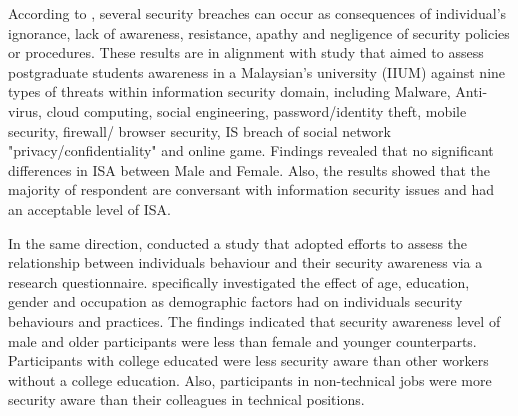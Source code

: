 According to \citet{safa2015information}, several security breaches can occur as consequences of individual's ignorance, lack of awareness, resistance, apathy and negligence of security policies or procedures. 
These results are in alignment with  \citet{Hamid2014} study that aimed to assess postgraduate students awareness in a Malaysian's university (IIUM) against nine types of threats within information security domain, including Malware, Anti-virus, cloud computing, social engineering, password/identity theft, mobile security, firewall/ browser security, IS breach of social network "privacy/confidentiality" and online game. Findings revealed that no significant differences in ISA between Male and Female. Also, the results showed that the majority of respondent are conversant with information security issues and had an acceptable level of ISA. 

In the same direction, \citet{Grant2010} conducted a study that adopted \citet{Katz2005} efforts to assess the relationship between individuals behaviour and their security awareness via a research questionnaire. \citet{Grant2010} specifically investigated the effect of age, education, gender and occupation as demographic factors had on individuals security behaviours and practices. The findings indicated that security awareness level of male and older participants were less than female and younger counterparts. Participants with college educated were less security aware than other workers without a college education. Also, participants in non-technical jobs were more security aware than their colleagues in technical positions. 


 

